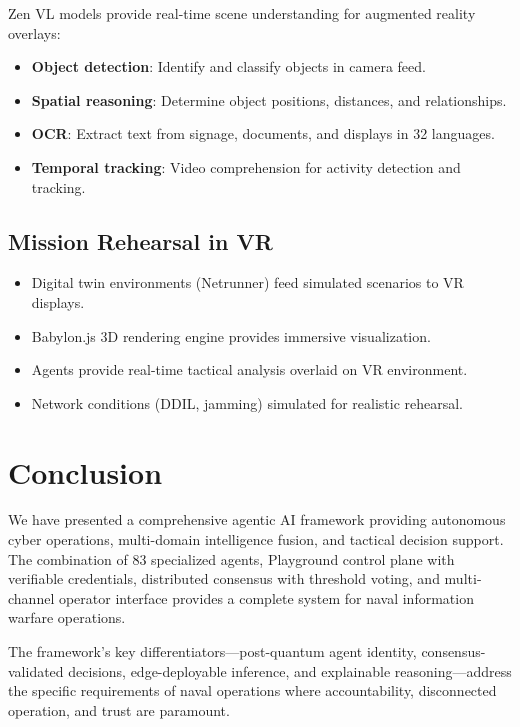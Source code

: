 \documentclass[11pt,letterpaper]{article}
\begin{document}
Zen VL models provide real-time scene understanding for augmented reality overlays:

\begin{itemize}
\item \textbf{Object detection}: Identify and classify objects in camera feed.
\item \textbf{Spatial reasoning}: Determine object positions, distances, and relationships.
\item \textbf{OCR}: Extract text from signage, documents, and displays in 32 languages.
\item \textbf{Temporal tracking}: Video comprehension for activity detection and tracking.
\end{itemize}

\subsection{Mission Rehearsal in VR}

\begin{itemize}
\item Digital twin environments (Netrunner) feed simulated scenarios to VR displays.
\item Babylon.js 3D rendering engine provides immersive visualization.
\item Agents provide real-time tactical analysis overlaid on VR environment.
\item Network conditions (DDIL, jamming) simulated for realistic rehearsal.
\end{itemize}

\section{Conclusion}

We have presented a comprehensive agentic AI framework providing autonomous cyber operations, multi-domain intelligence fusion, and tactical decision support. The combination of 83 specialized agents, Playground control plane with verifiable credentials, distributed consensus with threshold voting, and multi-channel operator interface provides a complete system for naval information warfare operations.

The framework's key differentiators---post-quantum agent identity, consensus-validated decisions, edge-deployable inference, and explainable reasoning---address the specific requirements of naval operations where accountability, disconnected operation, and trust are paramount.
\end{document}
